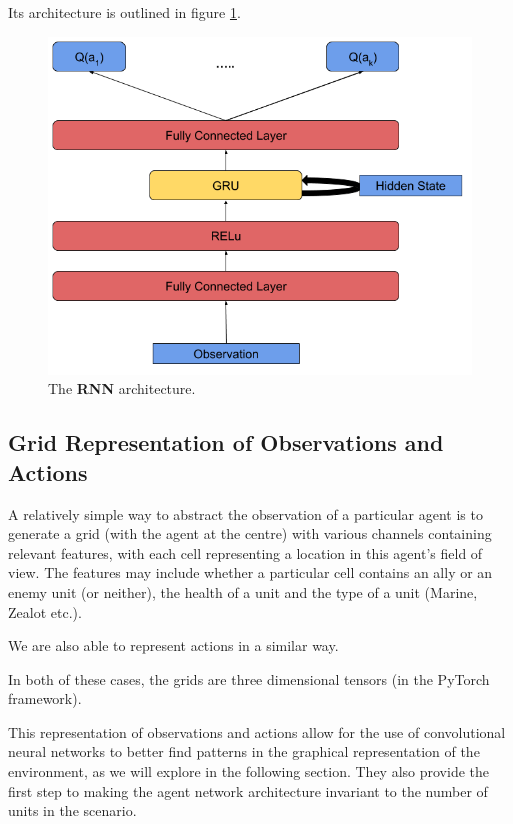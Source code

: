 Its architecture is outlined in figure \ref{fig:RNN_agent_diagram}.

\begin{figure}
    \centering
    \includegraphics[scale=0.45]{images/agent_diagrams/rnn_agent_diagram.png}
    \caption{The \textbf{RNN} architecture.}
    \label{fig:RNN_agent_diagram}
\end{figure}






\subsection{Grid Representation of Observations and Actions}

A relatively simple way to abstract the observation of a particular agent is to generate a grid (with the agent at the centre) with various channels containing relevant features, with each cell representing a location in this agent's field of view. The features may include whether a particular cell contains an ally or an enemy unit (or neither), the health of a unit and the type of a unit (Marine, Zealot etc.). 

We are also able to represent actions in a similar way. 

In both of these cases, the grids are three dimensional tensors (in the PyTorch framework).

This representation of observations and actions allow for the use of convolutional neural networks to better find patterns in the graphical representation of the environment, as we will explore in the following section. They also provide the first step to making the agent network architecture invariant to the number of units in the scenario.

